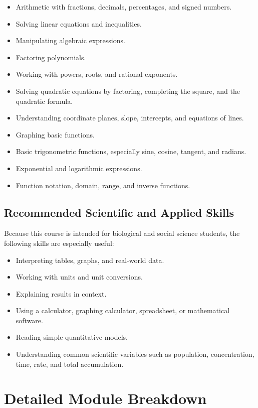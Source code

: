 \documentclass[11pt]{article}
\begin{document}
\begin{itemize}
    \item Arithmetic with fractions, decimals, percentages, and signed numbers.
    \item Solving linear equations and inequalities.
    \item Manipulating algebraic expressions.
    \item Factoring polynomials.
    \item Working with powers, roots, and rational exponents.
    \item Solving quadratic equations by factoring, completing the square, and the quadratic formula.
    \item Understanding coordinate planes, slope, intercepts, and equations of lines.
    \item Graphing basic functions.
    \item Basic trigonometric functions, especially sine, cosine, tangent, and radians.
    \item Exponential and logarithmic expressions.
    \item Function notation, domain, range, and inverse functions.
\end{itemize}

\subsection{Recommended Scientific and Applied Skills}

Because this course is intended for biological and social science students, the following skills are especially useful:

\begin{itemize}
    \item Interpreting tables, graphs, and real-world data.
    \item Working with units and unit conversions.
    \item Explaining results in context.
    \item Using a calculator, graphing calculator, spreadsheet, or mathematical software.
    \item Reading simple quantitative models.
    \item Understanding common scientific variables such as population, concentration, time, rate, and total accumulation.
\end{itemize}

\section{Detailed Module Breakdown}
\end{document}
